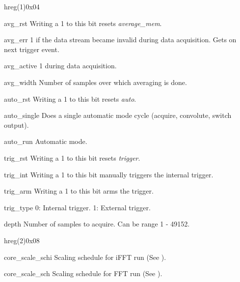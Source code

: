 \documentclass[12pt,a4paper,parskip=full,abstract=true,BCOR=12mm,twoside,open=right]{scrreprt}
\def\device#1{\textit{#1}}
\begin{document}
\begin{register}{h}{reg(1)}{0x04}%
    \label{reg1}%
    \regnewline%
    \begin{regdesc}\begin{reglist}
        \item[avg\_rst] Writing a 1 to this bit resets \device{average\_mem}.
        \item[avg\_err] 1 if the data stream became invalid during data
            acquisition. Gets on next trigger event.
        \item[avg\_active] 1 during data acquisition.
        \item[avg\_width] Number of samples over which averaging is done.
        \item[auto\_rst] Writing a 1 to this bit resets \device{auto}.
        \item[auto\_single] Does a single automatic mode cycle
            (acquire, convolute, switch output).
        \item[auto\_run] Automatic mode.
        \item[trig\_rst] Writing a 1 to this bit resets \device{trigger}.
        \item[trig\_int] Writing a 1 to this bit manually triggers the
            internal trigger.
        \item[trig\_arm] Writing a 1 to this bit arms the trigger.
        \item[trig\_type] 0: Internal trigger. 1: External trigger.
        \item[depth] Number of samples to acquire. Can be range 1 - 49152.
    \end{reglist}\end{regdesc}
\end{register}
\begin{register}{h}{reg(2)}{0x08}%
    \label{reg2}%
    \regnewline%
    \begin{regdesc}\begin{reglist}
        \item[core\_scale\_schi] Scaling schedule for iFFT run (See
            \cite{xilinx_fft}).
        \item[core\_scale\_sch] Scaling schedule for FFT run (See
            \cite{xilinx_fft}).
    \end{reglist}\end{regdesc}
\end{register}
\end{document}
